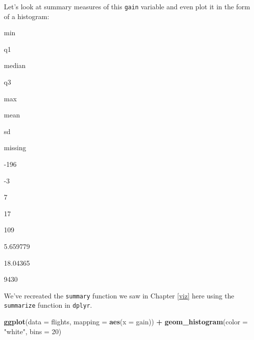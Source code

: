 \documentclass[12pt,]{krantz}
\makeatletter
\newenvironment{Shaded}{\begin{snugshade}}{\end{snugshade}}
\newcommand{\KeywordTok}[1]{\textcolor[rgb]{0.27,0.27,0.27}{\textbf{#1}}}
\newcommand{\DataTypeTok}[1]{\textcolor[rgb]{0.27,0.27,0.27}{#1}}
\newcommand{\DecValTok}[1]{\textcolor[rgb]{0.06,0.06,0.06}{#1}}
\newcommand{\FloatTok}[1]{\textcolor[rgb]{0.06,0.06,0.06}{#1}}
\newcommand{\StringTok}[1]{\textcolor[rgb]{0.5,0.5,0.5}{#1}}
\newcommand{\OtherTok}[1]{\textcolor[rgb]{0.37,0.37,0.37}{#1}}
\newcommand{\OperatorTok}[1]{\textcolor[rgb]{0.43,0.43,0.43}{\textbf{#1}}}
\newcommand{\NormalTok}[1]{#1}
\newenvironment{kframe}{%
\medskip{}
\setlength{\fboxsep}{.8em}
 \def\at@end@of@kframe{}%
 \ifinner\ifhmode%
  \def\at@end@of@kframe{\end{minipage}}%
  \begin{minipage}{\columnwidth}%
 \fi\fi%
 \def\FrameCommand##1{\hskip\@totalleftmargin \hskip-\fboxsep
 \colorbox{shadecolor}{##1}\hskip-\fboxsep
     \hskip-\linewidth \hskip-\@totalleftmargin \hskip\columnwidth}%
 \MakeFramed {\advance\hsize-\width
   \@totalleftmargin\z@ \linewidth\hsize
   \@setminipage}}%
 {\par\unskip\endMakeFramed%
 \at@end@of@kframe}
\renewenvironment{Shaded}{\begin{kframe}}{\end{kframe}}
\makeatother
\begin{document}
Let's look at summary measures of this \texttt{gain} variable and even
plot it in the form of a histogram:

\begin{Shaded}
\end{Shaded}

min

q1

median

q3

max

mean

sd

missing

-196

-3

7

17

109

5.659779

18.04365

9430

We've recreated the \texttt{summary} function we saw in Chapter
\ref{viz} here using the \texttt{summarize} function in \texttt{dplyr}.

\begin{Shaded}
\begin{Highlighting}[]
\KeywordTok{ggplot}\NormalTok{(}\DataTypeTok{data =}\NormalTok{ flights, }\DataTypeTok{mapping =} \KeywordTok{aes}\NormalTok{(}\DataTypeTok{x =}\NormalTok{ gain)) }\OperatorTok{+}
\StringTok{  }\KeywordTok{geom_histogram}\NormalTok{(}\DataTypeTok{color =} \StringTok{"white"}\NormalTok{, }\DataTypeTok{bins =} \DecValTok{20}\NormalTok{)}
\end{Highlighting}
\end{Shaded}
\end{document}
